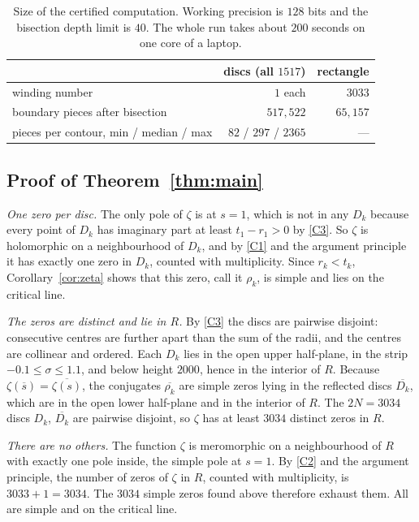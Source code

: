 \documentclass[11pt,a4paper]{article}
\theoremstyle{definition}
\newcommand{\conj}[1]{\overline{#1}}
\begin{document}
\begin{table}[ht]
\centering
\begin{tabular}{lrr}
\toprule
 & discs (all $1517$) & rectangle \\
\midrule
winding number & $1$ each & $3033$ \\
boundary pieces after bisection & $517{,}522$ & $65{,}157$ \\
pieces per contour, min / median / max & $82$ / $297$ / $2365$ & --- \\
\bottomrule
\end{tabular}
\caption{Size of the certified computation. Working precision is $128$ bits
and the bisection depth limit is $40$. The whole run takes about $200$ seconds
on one core of a laptop.}
\label{tab:stats}
\end{table}

\subsection{Proof of Theorem~\ref{thm:main}}

\emph{One zero per disc.} The only pole of $\zeta$ is at $s=1$, which is not in
any $D_k$ because every point of $D_k$ has imaginary part at least
$t_1-r_1>0$ by \ref{C3}. So $\zeta$ is holomorphic on a neighbourhood of
$D_k$, and by \ref{C1} and the argument principle it has exactly one zero in
$D_k$, counted with multiplicity. Since $r_k<t_k$, Corollary~\ref{cor:zeta}
shows that this zero, call it $\rho_k$, is simple and lies on the critical
line.

\emph{The zeros are distinct and lie in $R$.} By \ref{C3} the discs are
pairwise disjoint: consecutive centres are further apart than the sum of the
radii, and the centres are collinear and ordered. Each $D_k$ lies in the open
upper half-plane, in the strip $-0.1\le\sigma\le1.1$, and below height
$2000$, hence in the interior of $R$. Because
$\zeta(\conj{s})=\conj{\zeta(s)}$, the conjugates $\conj{\rho_k}$ are simple
zeros lying in the reflected discs $\conj{D_k}$, which are in the open lower
half-plane and in the interior of $R$. The $2N=3034$ discs $D_k$,
$\conj{D_k}$ are pairwise disjoint, so $\zeta$ has at least $3034$ distinct
zeros in $R$.

\emph{There are no others.} The function $\zeta$ is meromorphic on a
neighbourhood of $R$ with exactly one pole inside, the simple pole at $s=1$.
By \ref{C2} and the argument principle, the number of zeros of $\zeta$ in $R$,
counted with multiplicity, is $3033+1=3034$. The $3034$ simple zeros found
above therefore exhaust them. All are simple and on the critical line.
\end{document}
